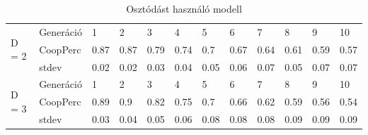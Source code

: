 \begin{table}[htb]
	\centering
	\begin{tabular}{ | l | l | l | l | l | l | l | l | l | l | l | l | }
		\hline
		\multirow{3}{*}{D = 2}
		& Generáció & 1 & 2 & 3 & 4 & 5 & 6 & 7 & 8 & 9 & 10 \\ \cline{2-12}
		& CoopPerc & 0.87 & 0.87 & 0.79 & 0.74 & 0.7 & 0.67 & 0.64 & 0.61 & 0.59 & 0.57 \\ \cline{2-12}
		& stdev & 0.02 & 0.02 & 0.03 & 0.04 & 0.05 & 0.06 & 0.07 & 0.05 & 0.07 & 0.07 \\ \hline
		\multirow{3}{*}{D = 3}
		& Generáció & 1 & 2 & 3 & 4 & 5 & 6 & 7 & 8 & 9 & 10 \\ \cline{2-12}
		& CoopPerc & 0.89 & 0.9 & 0.82 & 0.75 & 0.7 & 0.66 & 0.62 & 0.59 & 0.56 & 0.54 \\ \cline{2-12}
		& stdev & 0.03 & 0.04 & 0.05 & 0.06 & 0.08 & 0.08 & 0.08 & 0.09 & 0.09 & 0.09 \\ \hline
	\end{tabular}
	\vspace*{1mm}
	\caption{Osztódást használó modell}
	\label{table:osztodik}
\end{table}
